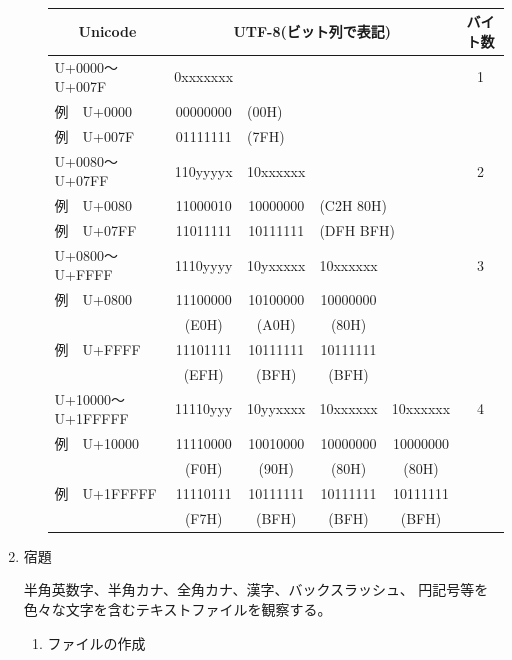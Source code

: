 \documentclass[uplatex,a4j,dvipdfmx]{ujarticle}
\begin{document}
\begin{enumerate}
\begin{enumerate}
{\tt%
\begin{tabular}{|l|cccc|c|}
\hline
\multicolumn{1}{|c}{Unicode} &
\multicolumn{4}{|c}{UTF-8(ビット列で表記)} &
\multicolumn{1}{|c|}{バイト数} \\
\hline
U+0000〜U+007F    & 0xxxxxxx &          &          &          & 1 \\
例　U+0000        & 00000000 & \multicolumn{3}{l|}{(00H)}     &   \\
例　U+007F        & 01111111 & \multicolumn{3}{l|}{(7FH)}     &   \\
\hline
U+0080〜U+07FF    & 110yyyyx & 10xxxxxx &          &          & 2 \\
例　U+0080        & 11000010 & 10000000 & \multicolumn{2}{l|}{(C2H 80H)} & \\
例　U+07FF        & 11011111 & 10111111 & \multicolumn{2}{l|}{(DFH BFH)} & \\
\hline
U+0800〜U+FFFF    & 1110yyyy & 10yxxxxx & 10xxxxxx &          & 3 \\
例　U+0800        & 11100000 & 10100000 & 10000000 &          &   \\
                  & (E0H)    & (A0H)    & (80H)    &          &   \\
例　U+FFFF        & 11101111 & 10111111 & 10111111 &          &   \\
                  & (EFH)    & (BFH)    & (BFH)    &          &   \\
\hline
U+10000〜U+1FFFFF & 11110yyy & 10yyxxxx & 10xxxxxx & 10xxxxxx & 4 \\
例　U+10000       & 11110000 & 10010000 & 10000000 & 10000000 &   \\
　                & (F0H)    & (90H)    & (80H)    & (80H)    &   \\
例　U+1FFFFF      & 11110111 & 10111111 & 10111111 & 10111111 &   \\
                  & (F7H)    & (BFH)    & (BFH)    & (BFH)    &   \\
\hline
\end{tabular}}

\end{enumerate}

\newpage

\item 宿題

半角英数字、半角カナ、全角カナ、漢字、バックスラッシュ、
円記号等を色々な文字を含むテキストファイルを観察する。

\begin{enumerate}
\item ファイルの作成


\end{enumerate}
\end{enumerate}
\end{document}
